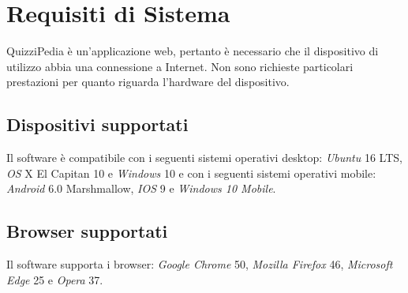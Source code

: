\newpage
\section{Requisiti di Sistema}
QuizziPedia è un'applicazione web, pertanto è necessario che il dispositivo di utilizzo abbia una connessione a Internet. Non sono richieste particolari prestazioni per quanto riguarda l'hardware del dispositivo.
\subsection{Dispositivi supportati}
Il software \progetto{} è compatibile con i seguenti sistemi operativi desktop: \textit{Ubuntu} 16 LTS, \textit{OS} X El Capitan 10 e \textit{Windows} 10 e con i seguenti sistemi operativi mobile: \textit{Android} 6.0 Marshmallow, \textit{IOS} 9 e \textit{Windows 10 Mobile}.
\subsection{Browser supportati}
Il software \progetto{} supporta i browser: \textit{Google Chrome} 50, \textit{Mozilla Firefox} 46, \textit{Microsoft Edge} 25 e \textit{Opera} 37.